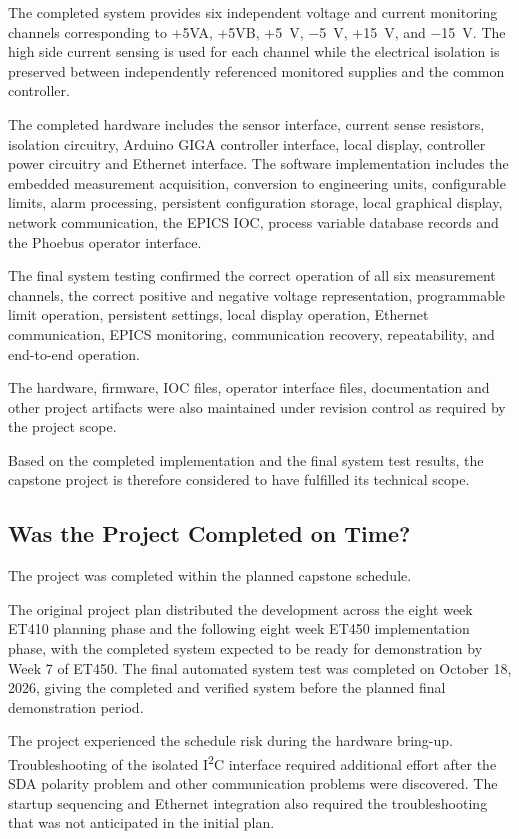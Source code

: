 The completed system provides six independent voltage and current monitoring channels corresponding to +5VA, +5VB, +5~V, $-$5~V, +15~V, and $-$15~V. The high side current sensing is used for each channel while the electrical isolation is preserved between independently referenced monitored supplies and the common controller.

The completed hardware includes the sensor interface, current sense resistors, isolation circuitry, Arduino GIGA controller interface, local display, controller power circuitry and Ethernet interface. The software implementation includes the embedded measurement acquisition, conversion to engineering units, configurable limits, alarm processing, persistent configuration storage, local graphical display, network communication, the EPICS IOC, process variable database records and the Phoebus operator interface.

The final system testing confirmed the correct operation of all six measurement channels, the correct positive and negative voltage representation, programmable limit operation, persistent settings, local display operation, Ethernet communication, EPICS monitoring, communication recovery, repeatability, and end-to-end operation.

The hardware, firmware, IOC files, operator interface files, documentation and other project artifacts were also maintained under revision control as required by the project scope.

Based on the completed implementation and the final system test results, the capstone project is therefore considered to have fulfilled its technical scope.

\subsection{Was the Project Completed on Time?}

The project was completed within the planned capstone schedule.

The original project plan distributed the development across the eight week ET410 planning phase and the following eight week ET450 implementation phase, with the completed system expected to be ready for demonstration by Week 7 of ET450. The final automated system test was completed on October 18, 2026, giving the completed and verified system before the planned final demonstration period.

The project experienced the schedule risk during the hardware bring-up. Troubleshooting of the isolated I\textsuperscript{2}C interface required additional effort after the SDA polarity problem and other communication problems were discovered. The startup sequencing and Ethernet integration also required the troubleshooting that was not anticipated in the initial plan.

